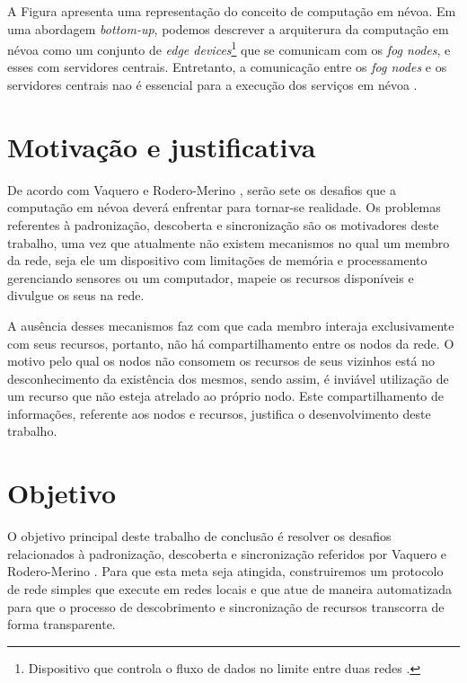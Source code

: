 A Figura \cite{archfog:2017} apresenta uma representação do conceito de computação em névoa. Em uma abordagem \textit{bottom-up}, podemos descrever a arquiterura da computação em névoa como um conjunto de \textit{edge devices}\footnote{Dispositivo que controla o fluxo de dados no limite entre duas redes \cite{edgeDevices}.} que se comunicam com os \textit{fog nodes}, e esses com servidores centrais.
Entretanto, a comunicação entre os \textit{fog nodes} e os servidores centrais nao é essencial para a execução dos serviços em névoa \cite{DBLP:journals/corr/RomanLM16}.


\section{Motivação e justificativa}

De acordo com Vaquero e Rodero-Merino \cite{Vaquero:2014}, serão sete os desafios que a computação em névoa deverá enfrentar para tornar-se realidade.
Os problemas referentes à padronização, descoberta e sincronização são os motivadores deste trabalho, uma vez que atualmente não existem mecanismos
no qual um membro da rede, seja ele um dispositivo com limitações de memória e processamento gerenciando sensores ou um computador, mapeie os recursos disponíveis e divulgue os seus na rede.

A ausência desses mecanismos faz com que cada membro interaja exclusivamente com seus recursos, portanto, não há compartilhamento entre os nodos da rede.
O motivo pelo qual os nodos não consomem os recursos de seus vizinhos está no desconhecimento da existência dos mesmos, sendo assim, é inviável utilização de um recurso que não esteja atrelado ao próprio nodo.
Este compartilhamento de informações, referente aos nodos e recursos, justifica o desenvolvimento deste trabalho.


\section{Objetivo}

O objetivo principal deste trabalho de conclusão é resolver os desafios relacionados à padronização, descoberta e sincronização referidos por Vaquero e Rodero-Merino \cite{Vaquero:2014}.
Para que esta meta seja atingida, construiremos um protocolo de rede simples que execute em redes locais e que atue de maneira automatizada para que o processo de
descobrimento e sincronização de recursos transcorra de forma transparente.











 
 
 
 
 
 
 
 










